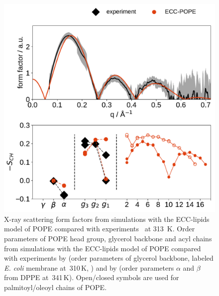 \begin{figure}[tb!] 
  \centering 
  \includegraphics[width=\figwidth]{../img/ecc_pope/Order-parameters_form-factors_exp-ECC-POPE.pdf}
  \caption{\label{simVSexpNOions_POPE} 
    X-ray scattering form factors from simulations with 
    the ECC-lipids model of POPE compared with experiments~\cite{kucerka11} at 313~K. 
    Order parameters of POPE head group, glycerol backbone and acyl chains  
    from simulations with the ECC-lipids model of POPE
    compared with experiments by \citet{gally81} (order parameters of glycerol backbone, labeled \emph{E. coli} membrane at~310\,K, ) 
    and by \citet{seelig76, seelig80} (order parameters $\alpha$ and $\beta$ from DPPE at~341\,K).
    Open/closed symbols are used for palmitoyl/oleoyl chains of POPE. 
  }  
\end{figure} 


